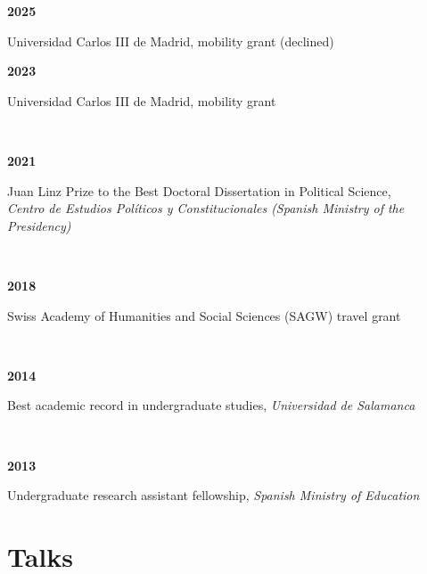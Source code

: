 \documentclass[a4paper, 12pt]{article}
\begin{document}
\begin{minipage}[t]{0.1\textwidth}
\textbf{2025}
\end{minipage}\hfill\begin{minipage}[t]{0.9\textwidth}
Universidad Carlos III de Madrid, mobility grant (declined)
\end{minipage}
\begin{minipage}[t]{0.1\textwidth}
\textbf{2023}
\end{minipage}\hfill\begin{minipage}[t]{0.9\textwidth}
Universidad Carlos III de Madrid, mobility grant
\end{minipage}\\
\begin{minipage}[t]{0.1\textwidth}
\textbf{2021}
\end{minipage}\hfill\begin{minipage}[t]{0.9\textwidth}
Juan Linz Prize to the Best Doctoral Dissertation in Political Science,\\\textit{Centro de Estudios Políticos y Constitucionales (Spanish Ministry of the Presidency)}\\\vspace{-8pt}
\end{minipage}\\
\begin{minipage}[t]{0.1\textwidth}
\textbf{2018}
\end{minipage}\hfill\begin{minipage}[t]{0.9\textwidth}
Swiss Academy of Humanities and Social Sciences (SAGW) travel grant
\end{minipage}\\
\begin{minipage}[t]{0.1\textwidth}
\textbf{2014}
\end{minipage}\hfill\begin{minipage}[t]{0.9\textwidth}
Best academic record in undergraduate studies, {\it Universidad de Salamanca}
\end{minipage}\\
\begin{minipage}[t]{0.1\textwidth}
\textbf{2013}
\end{minipage}\hfill\begin{minipage}[t]{0.9\textwidth}
Undergraduate research assistant fellowship, {\it Spanish Ministry of Education}
\end{minipage}

\section*{Talks}
\end{document}

